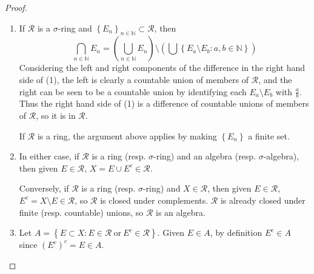 \documentclass{article}
\theoremstyle{definition}
\begin{document}
\begin{proof}
	\ \begin{enumerate}[label=\textbf{\alph*.}]
		\item If $\mathscr{R}$ is a $\sigma$-ring and $\left\lbrace E_n \right\rbrace_{n \in \mathbb{N}} \subset \mathscr{R}$, then \begin{equation*}
			      \bigcap_{n \in \mathbb{N}} E_n = \left( \bigcup_{n \in \mathbb{N}} E_n \right) \setminus \left( \bigcup \left\lbrace E_a \setminus E_b : a, b \in \mathbb{N} \right\rbrace \right) \tag{1}
		      \end{equation*}
		      Considering the left and right components of the difference in the right hand side of (1), the left is clearly a countable union of members of $\mathscr{R}$, and the right can be seen to be a countable union by identifying each $E_a \setminus E_b$ with $\frac{a}{b}$.
		      Thus the right hand side of (1) is a difference of countable unions of members of $\mathscr{R}$, so it is in $\mathscr{R}$.

		      If $\mathscr{R}$ is a ring, the argument above applies by making $\left\lbrace E_n \right\rbrace$ a finite set.

		\item In either case, if $\mathscr{R}$ is a ring (resp. $\sigma$-ring) and an algebra (resp. $\sigma$-algebra), then given $E \in \mathscr{R}$, $X = E \cup E^c \in \mathscr{R}$.

		      Conversely, if $\mathscr{R}$ is a ring (resp. $\sigma$-ring) and $X \in \mathscr{R}$, then given $E \in \mathscr{R}$, $E^c = X \setminus E \in \mathscr{R}$, so $\mathscr{R}$ is closed under complements.
		      $\mathscr{R}$ is already closed under finite (resp. countable) unions, so $\mathscr{R}$ is an algebra.

		\item Let $A = \left\lbrace E \subset X : E \in \mathscr{R}\ \mathrm{or}\ E^c \in \mathscr{R} \right\rbrace$.
		      Given $E \in A$, by definition $E^c \in A$ since $(E^c)^c = E \in A$.


\end{enumerate}
\end{proof}
\end{document}
